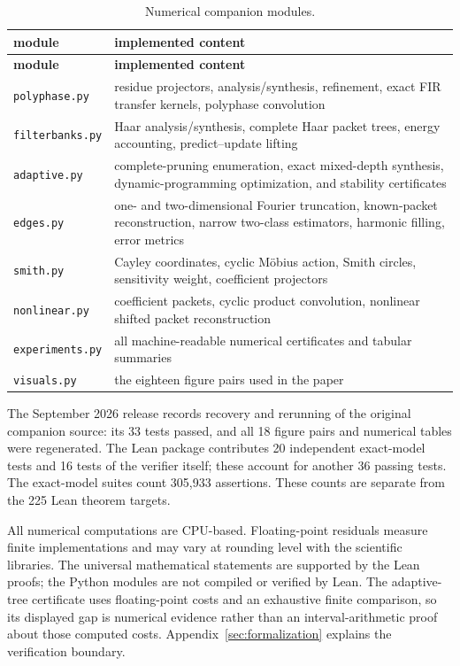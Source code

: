 \documentclass[11pt]{article}
\theoremstyle{definition}
\theoremstyle{remark}
\begin{document}
\begin{longtable}{L{0.27\textwidth}L{0.64\textwidth}}
\caption{Numerical companion modules.}\label{tab:modules}\\
\toprule
\textbf{module}&\textbf{implemented content}\\
\midrule
\endfirsthead
\toprule
\textbf{module}&\textbf{implemented content}\\
\midrule
\endhead
\texttt{polyphase.py}&residue projectors, analysis/synthesis, refinement, exact FIR transfer kernels, polyphase convolution\\
\texttt{filterbanks.py}&Haar analysis/synthesis, complete Haar packet trees, energy accounting, predict--update lifting\\
\texttt{adaptive.py}&complete-pruning enumeration, exact mixed-depth synthesis, dynamic-programming optimization, and stability certificates\\
\texttt{edges.py}&one- and two-dimensional Fourier truncation, known-packet reconstruction, narrow two-class estimators, harmonic filling, error metrics\\
\texttt{smith.py}&Cayley coordinates, cyclic M\"obius action, Smith circles, sensitivity weight, coefficient projectors\\
\texttt{nonlinear.py}&coefficient packets, cyclic product convolution, nonlinear shifted packet reconstruction\\
\texttt{experiments.py}&all machine-readable numerical certificates and tabular summaries\\
\texttt{visuals.py}&the eighteen figure pairs used in the paper\\
\bottomrule
\end{longtable}

The September 2026 release records recovery and rerunning of the original companion source: its 33 tests passed, and all 18 figure pairs and numerical tables were regenerated. The Lean package contributes 20 independent exact-model tests and 16 tests of the verifier itself; these account for another 36 passing tests. The exact-model suites count 305,933 assertions. These counts are separate from the 225 Lean theorem targets.

All numerical computations are CPU-based. Floating-point residuals measure finite implementations and may vary at rounding level with the scientific libraries. The universal mathematical statements are supported by the Lean proofs; the Python modules are not compiled or verified by Lean. The adaptive-tree certificate uses floating-point costs and an exhaustive finite comparison, so its displayed gap is numerical evidence rather than an interval-arithmetic proof about those computed costs. Appendix~\ref{sec:formalization} explains the verification boundary.
\end{document}
